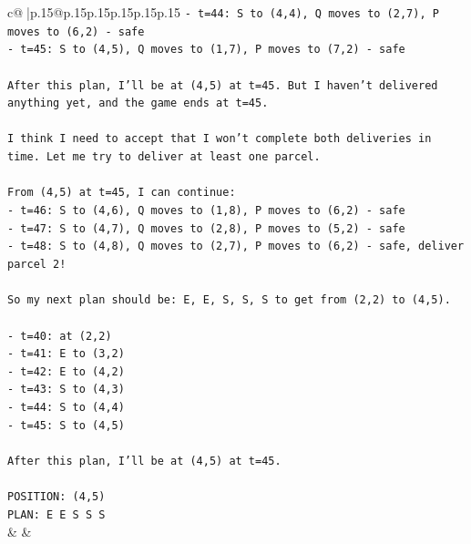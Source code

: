 \documentclass{article}
\begin{document}
{\begin{supertabular}{c@{$\;$}|p{.15\linewidth}@{}p{.15\linewidth}p{.15\linewidth}p{.15\linewidth}p{.15\linewidth}p{.15\linewidth}}
{{{\texttt{{-} t=44: S to (4,4), Q moves to (2,7), P moves to (6,2) {-} safe} \\
\texttt{{-} t=45: S to (4,5), Q moves to (1,7), P moves to (7,2) {-} safe} \\
\\ 
\texttt{After this plan, I'll be at (4,5) at t=45. But I haven't delivered anything yet, and the game ends at t=45.} \\
\\ 
\texttt{I think I need to accept that I won't complete both deliveries in time. Let me try to deliver at least one parcel.} \\
\\ 
\texttt{From (4,5) at t=45, I can continue:} \\
\texttt{{-} t=46: S to (4,6), Q moves to (1,8), P moves to (6,2) {-} safe} \\
\texttt{{-} t=47: S to (4,7), Q moves to (2,8), P moves to (5,2) {-} safe} \\
\texttt{{-} t=48: S to (4,8), Q moves to (2,7), P moves to (6,2) {-} safe, deliver parcel 2!} \\
\\ 
\texttt{So my next plan should be: E, E, S, S, S to get from (2,2) to (4,5).} \\
\\ 
\texttt{{-} t=40: at (2,2)} \\
\texttt{{-} t=41: E to (3,2)} \\
\texttt{{-} t=42: E to (4,2)} \\
\texttt{{-} t=43: S to (4,3)} \\
\texttt{{-} t=44: S to (4,4)} \\
\texttt{{-} t=45: S to (4,5)} \\
\\ 
\texttt{After this plan, I'll be at (4,5) at t=45.} \\
\\ 
\texttt{POSITION: (4,5)} \\
\texttt{PLAN: E E S S S} \\
            }
        }
    }
    & & \\ \\


\end{supertabular}}
\end{document}
